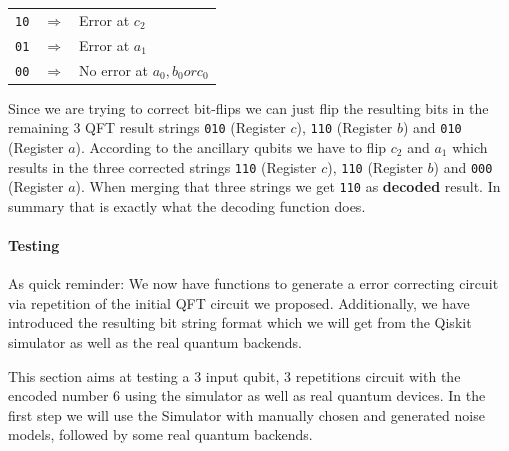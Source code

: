 \begin{center}
    \begin{tabular}{ r c l }
        \texttt{10} & \(\Rightarrow\) & Error at \(c_2\) \\
        \texttt{01} & \(\Rightarrow\) & Error at \(a_1\) \\
        \texttt{00} & \(\Rightarrow\) & No error at \(a_0, b_0 or c_0\) \\
    \end{tabular}
\end{center}

Since we are trying to correct bit-flips we can just flip the resulting bits in the remaining 3 QFT result strings \texttt{010} (Register \(c\)), \texttt{110} (Register \(b\)) and \texttt{010} (Register \(a\)).
According to the ancillary qubits we have to flip \(c_2\) and \(a_1\) which results in the three corrected strings \texttt{110} (Register \(c\)), \texttt{110} (Register \(b\)) and \texttt{000} (Register \(a\)).
When merging that three strings we get \texttt{110} as \textbf{decoded} result.
In summary that is exactly what the decoding function does.

\paragraph{Testing}

As quick reminder: We now have functions to generate a error correcting circuit via repetition of the initial QFT circuit we proposed.
Additionally, we have introduced the resulting bit string format which we will get from the Qiskit simulator as well as the real quantum backends.

This section aims at testing a 3 input qubit, 3 repetitions circuit with the encoded number 6 using the simulator as well as real quantum devices.
In the first step we will use the Simulator with manually chosen and generated noise models, followed by some real quantum backends.


